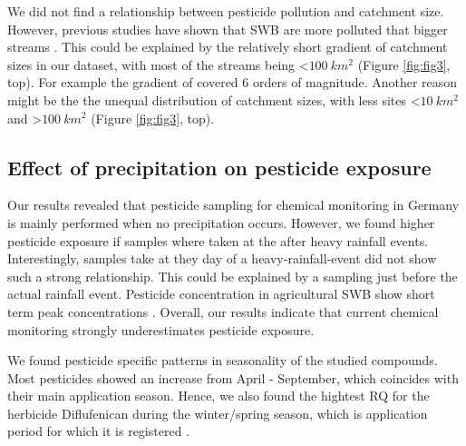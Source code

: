 \documentclass[journal=esthag,manuscript=article]{achemso}
\begin{document}
We did not find a relationship between pesticide pollution and catchment size.
However, previous studies have shown that SWB are more polluted that bigger streams \citep{schulz_field_2004,stehle_pesticide_2015,knauer_pesticides_2016}.
This could be explained by the relatively short gradient of catchment sizes in our dataset, with most of the streams being \textless $100~km^2$ (Figure \ref{fig:fig3}, top).
For example the gradient of \citet{schulz_field_2004} covered 6 orders of magnitude.
Another reason might be the the unequal distribution of catchment sizes, with less sites \textless $10~km^2$ and \textgreater $100~km^2$ (Figure \ref{fig:fig3}, top).



\subsection{Effect of precipitation on pesticide exposure}
Our results revealed that pesticide sampling for chemical monitoring in Germany is mainly performed when no precipitation occurs. 
However, we found higher pesticide exposure if samples where taken at the after heavy rainfall events. 
Interestingly, samples take at they day of a heavy-rainfall-event did not show such a strong relationship.
This could be explained by a sampling just before the actual rainfall event.
Pesticide concentration in agricultural SWB show short term peak concentrations \citep{wittmer_significance_2010}.
Overall, our results indicate that current chemical monitoring strongly underestimates pesticide exposure. 


We found pesticide specific patterns in seasonality of the studied compounds.
Most pesticides showed an increase from April - September, which coincides with their main application season.
Hence, we also found the hightest RQ for the herbicide Diflufenican during the winter/spring season, which is application period for which it is registered . 
\end{document}

